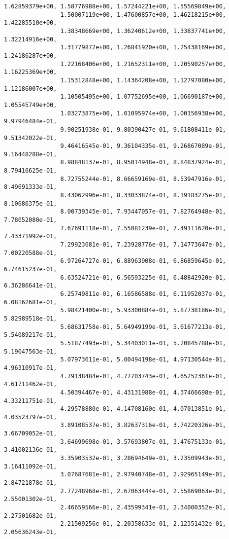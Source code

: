 \documentclass[11pt]{article}
\begin{document}
\begin{Verbatim}[commandchars=\\\{\}]
                1.62859379e+00, 1.58776988e+00, 1.57244221e+00, 1.55569849e+00,
                1.50007119e+00, 1.47600857e+00, 1.46218215e+00, 1.42285510e+00,
                1.38348669e+00, 1.36240612e+00, 1.33837741e+00, 1.32214916e+00,
                1.31779872e+00, 1.26841920e+00, 1.25438169e+00, 1.24186287e+00,
                1.22168406e+00, 1.21652311e+00, 1.20590257e+00, 1.16225369e+00,
                1.15312848e+00, 1.14364208e+00, 1.12797080e+00, 1.12186007e+00,
                1.10505495e+00, 1.07752695e+00, 1.06690187e+00, 1.05545749e+00,
                1.03273875e+00, 1.01095974e+00, 1.00156938e+00, 9.97946484e-01,
                9.90251938e-01, 9.80390427e-01, 9.61808411e-01, 9.51342022e-01,
                9.46416545e-01, 9.36104335e-01, 9.26867089e-01, 9.16448288e-01,
                8.98848137e-01, 8.95014948e-01, 8.84837924e-01, 8.79416625e-01,
                8.72755244e-01, 8.66659169e-01, 8.53947916e-01, 8.49691333e-01,
                8.43062996e-01, 8.33033874e-01, 8.19183275e-01, 8.10686375e-01,
                8.00739345e-01, 7.93447057e-01, 7.82764948e-01, 7.78052080e-01,
                7.67691118e-01, 7.55081239e-01, 7.49111620e-01, 7.43371992e-01,
                7.29923681e-01, 7.23928776e-01, 7.14773647e-01, 7.00220588e-01,
                6.97264727e-01, 6.88963908e-01, 6.86859645e-01, 6.74615237e-01,
                6.63524721e-01, 6.56593225e-01, 6.48842920e-01, 6.36286641e-01,
                6.25749811e-01, 6.16586588e-01, 6.11952037e-01, 6.08162681e-01,
                5.98421400e-01, 5.93300884e-01, 5.87738186e-01, 5.82989518e-01,
                5.68631758e-01, 5.64949199e-01, 5.61677213e-01, 5.54089217e-01,
                5.51877493e-01, 5.34403011e-01, 5.20845788e-01, 5.19047563e-01,
                5.07973611e-01, 5.00494198e-01, 4.97130544e-01, 4.96310917e-01,
                4.79138484e-01, 4.77703743e-01, 4.65252361e-01, 4.61711462e-01,
                4.50394467e-01, 4.43131988e-01, 4.37466698e-01, 4.33211751e-01,
                4.29578880e-01, 4.14708160e-01, 4.07013851e-01, 4.03523797e-01,
                3.89108537e-01, 3.82637316e-01, 3.74220326e-01, 3.66709052e-01,
                3.64699698e-01, 3.57693807e-01, 3.47675133e-01, 3.41002136e-01,
                3.35903532e-01, 3.28694649e-01, 3.23509943e-01, 3.16411092e-01,
                3.07687681e-01, 2.97940748e-01, 2.92965149e-01, 2.84721878e-01,
                2.77248968e-01, 2.67063444e-01, 2.55869063e-01, 2.55001302e-01,
                2.46659566e-01, 2.43599341e-01, 2.34000352e-01, 2.27501682e-01,
                2.21509256e-01, 2.20358633e-01, 2.12351432e-01, 2.05636243e-01,

\end{Verbatim}
\end{document}
